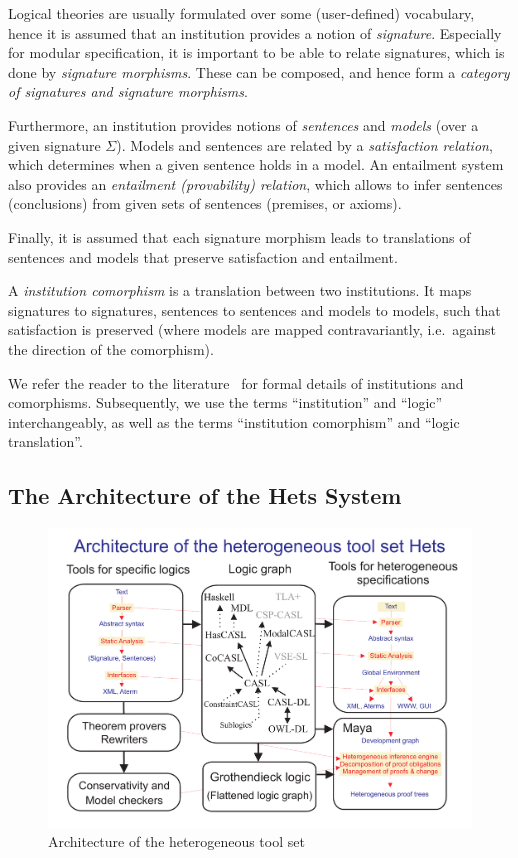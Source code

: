 Logical theories are usually formulated over some (user-defined)
vocabulary, hence it is assumed that an institution provides a notion
of \emph{signature}. Especially for modular specification, it is
important to be able to relate signatures, which is done by
\emph{signature morphisms}.  These can be composed, and hence form a
\emph{category of signatures and signature morphisms}.

Furthermore, an institution provides notions of \emph{sentences} and
\emph{models} (over a given signature $\Sigma$).  Models and sentences
are related by a \emph{satisfaction relation}, which determines when a
given sentence holds in a model.  An entailment system also provides
an \emph{entailment (provability) relation}, which allows to infer
sentences (conclusions) from given sets of sentences (premises, or axioms).

Finally, it is assumed that each signature morphism leads to
translations of sentences and models that preserve satisfaction and
entailment.

A {\emph{institution comorphism}} is a translation between two institutions.  It maps
signatures to signatures, sentences to sentences and models to models, such that
satisfaction is preserved (where models are mapped contravariantly, i.e.\ against the
direction of the comorphism).
  
We refer the reader to the literature~\cite{GoguenBurstall92,Meseguer89,MossakowskiEA05c}
for formal details of institutions and comorphisms. Subsequently, we use the terms
``institution'' and ``logic'' interchangeably, as well as the terms ``institution
comorphism'' and ``logic translation''.


\subsection{The Architecture of the Hets System}

\begin{figure}[ht]
  \begin{center}
    \includegraphics[width=\textwidth]{projects/hets/hets-new}
    \caption{Architecture of the heterogeneous tool set}
    \label{fig:hetcats}
  \end{center}
\end{figure}

